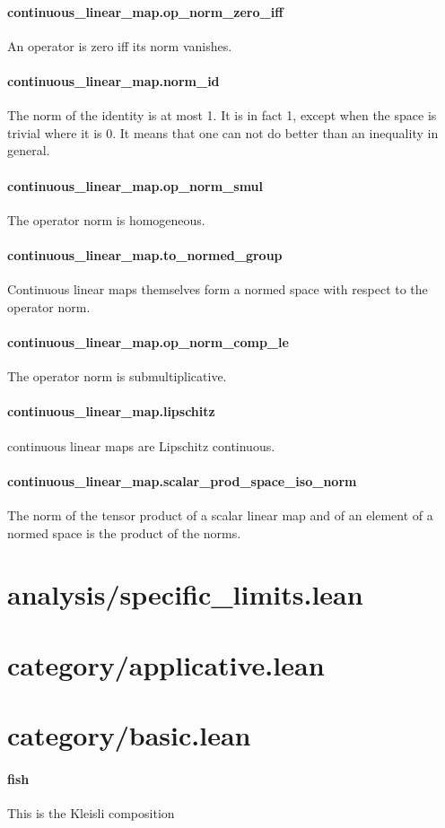 \documentclass{article}
\begin{document}
\paragraph{continuous\_linear\_map.op\_norm\_zero\_iff}
\par
An operator is zero iff its norm vanishes.
\paragraph{continuous\_linear\_map.norm\_id}
\par
The norm of the identity is at most 1. It is in fact 1, except when the space is trivial where
it is 0. It means that one can not do better than an inequality in general.
\paragraph{continuous\_linear\_map.op\_norm\_smul}
\par
The operator norm is homogeneous.
\paragraph{continuous\_linear\_map.to\_normed\_group}
\par
Continuous linear maps themselves form a normed space with respect to
the operator norm.
\paragraph{continuous\_linear\_map.op\_norm\_comp\_le}
\par
The operator norm is submultiplicative.
\paragraph{continuous\_linear\_map.lipschitz}
\par
continuous linear maps are Lipschitz continuous.
\paragraph{continuous\_linear\_map.scalar\_prod\_space\_iso\_norm}
\par
The norm of the tensor product of a scalar linear map and of an element of a normed space
is the product of the norms.
\section{analysis/specific\_limits.lean}\section{category/applicative.lean}\section{category/basic.lean}\paragraph{fish}
\par
This is the Kleisli composition
\end{document}
